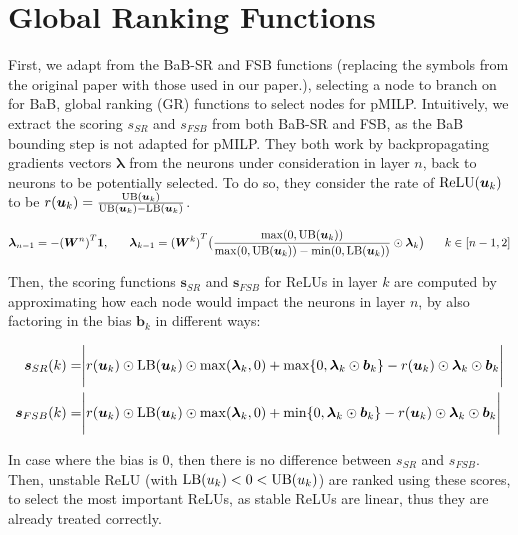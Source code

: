 \section{Global Ranking Functions}

\label{sec4p5}

First, we adapt from the BaB-SR \cite{BaB} and FSB \cite{FSB} functions (replacing the symbols from the original paper with those used in our paper.), selecting a node to branch on for BaB, global ranking (GR) functions to select nodes for pMILP. Intuitively, we extract the scoring $s_{SR}$ and $s_{FSB}$ from both BaB-SR and FSB, as the BaB bounding step is not adapted for pMILP. They both work by backpropagating gradients vectors $\bm{\lambda}$ from the neurons under consideration in layer $n$, back to neurons to be potentially selected. To do so, they consider the rate of $\mathrm{ReLU}(\bm{u}_k)$ to be $r(\bm{u}_k)=\frac{\mathrm{UB}(\bm{u}_k)}{\mathrm{UB}(\bm{u}_k)-\mathrm{LB}(\bm{u}_k)}$.

\begin{align*}
\bm{\lambda}_{n-1} = -{(\bm{W}^n)}^T\bm{1}, \hspace*{4ex}  	\bm{\lambda}_{k-1} = {(\bm{W}^k)}^T\big(\frac{\max(0,\mathrm{UB}(\bm{u}_k))}{\max(0,\mathrm{UB}(\bm{u}_k))-\min(0,\mathrm{LB}(\bm{u}_k))}\odot\bm{\lambda}_{k}\big) \hspace*{4ex}  k\in [n-1,2]
\end{align*}


Then, the scoring functions $\bm{s}_{SR}$ and $\bm{s}_{FSB}$ for ReLUs in layer $k$ are computed by approximating how each node would impact the neurons in layer $n$, by also factoring in the bias $\bm{b}_k$ in different ways:

\begin{align*}
	\bm{s}_{SR}(k) =& %
	\Biggl\lvert r(\bm{u}_k) \odot \LB(\bm{u}_k) \odot \max(\bm{\lambda}_{k},0)
	+ \max\{0,\bm{\lambda}_{k}\odot\bm{b}_{k}\}-r(\bm{u}_k) \odot\bm{\lambda}_{k}\odot\bm{{b}}_{k}
	\Biggr\rvert  \\
	\bm{s}_{FSB}(k) =& \Biggl\lvert r(\bm{u}_k) \odot \LB(\bm{u}_k) \odot \max(\bm{\lambda}_{k},0)
	+ \min\{0,\bm{\lambda}_{k}\odot\bm{b}_{k}\}-r(\bm{u}_k) \odot\bm{\lambda}_{k}\odot\bm{{b}}_{k}
	\Biggr\rvert
\end{align*}

In case where the bias is 0, then there is no difference between $s_{SR}$ and $s_{FSB}$.
Then, unstable ReLU (with $\mathrm{LB}(u_k) < 0 < \mathrm{UB}(u_k)$) are ranked using these scores, to select the most important ReLUs, as stable ReLUs are linear, thus they are already treated correctly.


